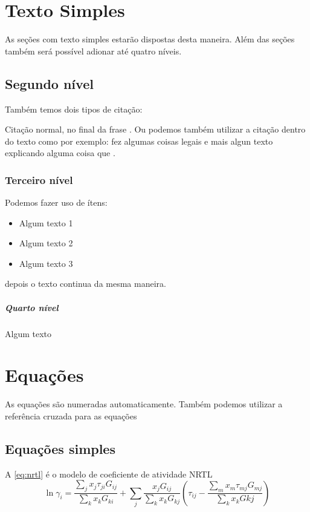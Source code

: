\section {Texto Simples}
As seções com texto simples estarão dispostas desta maneira. Além das seções
também será possível adionar até quatro níveis.

\subsection{Segundo nível}
Também temos dois tipos de citação:

Citação normal, no final da frase \cite{Flores2016,Soares2013}. Ou podemos
também utilizar a citação dentro do texto como por exemplo:
 fez algumas coisas legais e mais algun texto explicando
alguma coisa que .



\subsubsection{Terceiro nível}
Podemos fazer uso de ítens:
\begin{itemize}
  \item Algum texto 1
  \item Algum texto 2
  \item Algum texto 3
\end{itemize}
depois o texto continua da mesma maneira.

\subparagraph{Quarto nível}
Algum texto

\section {Equações}
As equações são numeradas automaticamente. Também podemos utilizar a referência
cruzada para as equações

\subsection{Equações simples}
A \autoref{eq:nrtl} é o modelo de coeficiente de atividade NRTL
\begin{equation}\label{eq:nrtl}
\ln \gamma_i = \frac{\displaystyle\sum_j x_j \tau_{ji}
G_{ij}}{\displaystyle\sum_k x_k G_{ki}} + \displaystyle\sum_j \frac{x_j G_{ij}}{\displaystyle\sum_k x_k G_{kj}}\left(
\tau_{ij} - \frac{\displaystyle\sum_m x_m \tau_{mj} G_{mj}}{\displaystyle\sum_k x_k G{kj}} \right)
\end{equation}

